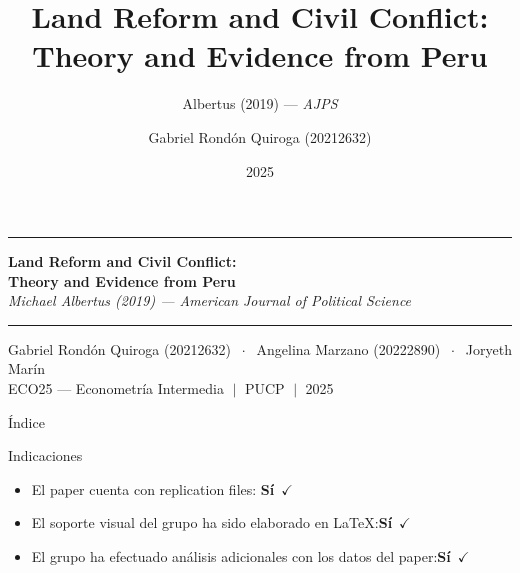 \documentclass[aspectratio=169,t]{beamer}
\title[Land Reform \& Civil Conflict]{Land Reform and Civil Conflict: Theory and Evidence from Peru}
\subtitle{Albertus (2019) --- \textit{AJPS}}
\author[Rond\'on]{%
  Gabriel Rond\'on Quiroga (20212632) }
\institute[PUCP]{ECO25 --- Econometr\'ia Intermedia, PUCP}
\date{2025}
\newcommand{\hl}[1]{\textcolor{azulmedio}{\textbf{#1}}}
\begin{document}
{
\begin{frame}[plain]
\vspace{0.5cm}
\begin{center}
  {\color{azuloscuro}\rule{\textwidth}{2.5pt}}\vspace{0.3cm}

  {\Large\bfseries\color{azuloscuro}
    Land Reform and Civil Conflict:}\\[0.2cm]
  {\large\bfseries\color{azuloscuro}
    Theory and Evidence from Peru}\\[0.22cm]
  {\small\color{azulmedio}\textit{%
    Michael Albertus (2019) ---
    American Journal of Political Science}}

  \vspace{0.25cm}
  {\color{azuloscuro}\rule{\textwidth}{2.5pt}}
  \vspace{0.3cm}

  {\normalsize\color{azuloscuro}
    Gabriel Rond\'on Quiroga {\small(20212632)}
    $\;\cdot\;$
    Angelina Marzano {\small(20222890)}
    $\;\cdot\;$
    Joryeth Mar\'in }\\[0.18cm]
  {\small\color{gray}
    ECO25 --- Econometr\'ia Intermedia
    $\;|\;$ PUCP $\;|\;$ 2025}
\end{center}
\end{frame}
}

\begin{frame}{\'Indice}
  \tableofcontents
\end{frame}

\begin{frame}{Indicaciones}
\vspace{0.7cm}
\begin{itemize}\setlength{\itemsep}{0.55cm}
  \item El paper cuenta con replication files:
        \quad\hl{S\'i}~$\checkmark$
  \item El soporte visual del grupo ha sido elaborado
        en \LaTeX:\quad\hl{S\'i}~$\checkmark$
  \item El grupo ha efectuado an\'alisis adicionales
        con los datos del paper:\quad\hl{S\'i}~$\checkmark$
\end{itemize}
\end{frame}
\end{document}

